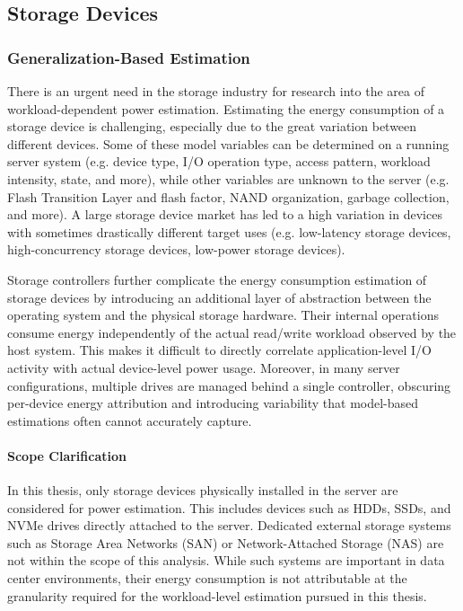 \subsection{Storage Devices}
\label{sec:model-based_storage_power}

\subsubsection{Generalization-Based Estimation}

There is an urgent need in the storage industry for research into the area of workload-dependent power estimation\parencite{allaloufStorageModelingPower2009}. Estimating the energy consumption of a storage device is challenging, especially due to the great variation between different devices. Some of these model variables can be determined on a running server system (e.g. device type, I/O operation type, access pattern, workload intensity, state, and more), while other variables are unknown to the server (e.g. Flash Transition Layer and flash factor, NAND organization, garbage collection, and more). A large storage device market has led to a high variation in devices with sometimes drastically different target uses (e.g. low-latency storage devices, high-concurrency storage devices, low-power storage devices).

Storage controllers further complicate the energy consumption estimation of storage devices by introducing an additional layer of abstraction between the operating system and the physical storage hardware. Their internal operations consume energy independently of the actual read/write workload observed by the host system. This makes it difficult to directly correlate application-level I/O activity with actual device-level power usage. Moreover, in many server configurations, multiple drives are managed behind a single controller, obscuring per-device energy attribution and introducing variability that model-based estimations often cannot accurately capture.

\paragraph{Scope Clarification} 

In this thesis, only storage devices physically installed in the server are considered for power estimation. This includes devices such as HDDs, SSDs, and NVMe drives directly attached to the server. Dedicated external storage systems such as Storage Area Networks (SAN) or Network-Attached Storage (NAS) are not within the scope of this analysis. While such systems are important in data center environments, their energy consumption is not attributable at the granularity required for the workload-level estimation pursued in this thesis.

